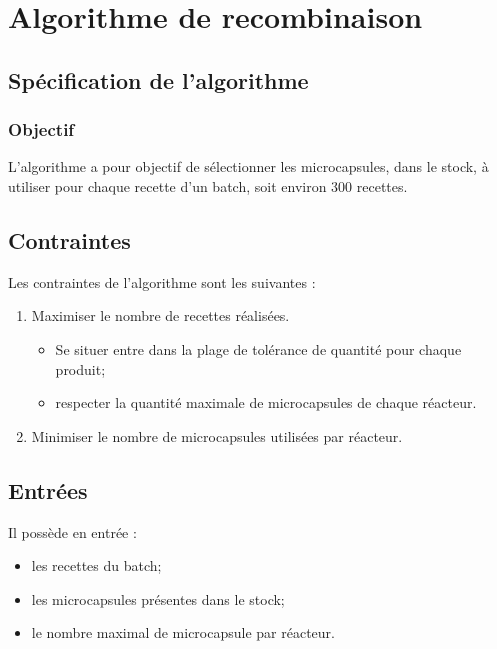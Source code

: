 \section{Algorithme de recombinaison}
\subsection{Spécification de l'algorithme}
\subsubsection*{Objectif}
L'algorithme a pour objectif de sélectionner les microcapsules, dans le stock, à utiliser pour chaque recette d'un batch, soit environ $300$ recettes.

\subsection*{Contraintes}
Les contraintes de l'algorithme sont les suivantes : 
\begin{enumerate}
    \item Maximiser le nombre de recettes réalisées.
    \begin{itemize}
        \item Se situer entre dans la plage de tolérance de quantité pour chaque produit; 
        \item respecter la quantité maximale de microcapsules de chaque réacteur.
    \end{itemize}    
    \item Minimiser le nombre de microcapsules utilisées par réacteur.
\end{enumerate}
\subsection*{Entrées}
Il possède en entrée : 
\begin{itemize}
    \item les recettes du batch;
    \item les microcapsules présentes dans le stock;
    \item le nombre maximal de microcapsule par réacteur.
\end{itemize}

